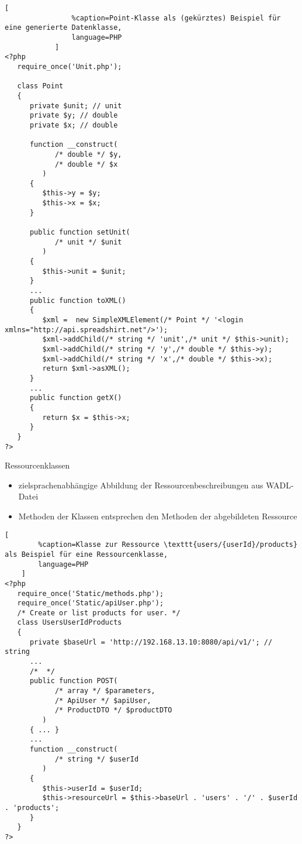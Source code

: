 \begin{frame}
    \begin{multicols}{2}
        \begin{lstlisting}[
                %caption=Point-Klasse als (gekürztes) Beispiel für eine generierte Datenklasse,
                language=PHP
            ]
<?php
   require_once('Unit.php');

   class Point
   {
      private $unit; // unit 
      private $y; // double 
      private $x; // double 

      function __construct(
            /* double */ $y,
            /* double */ $x
         )
      {
         $this->y = $y;
         $this->x = $x;
      }

      public function setUnit(
            /* unit */ $unit
         )
      {
         $this->unit = $unit;
      }
      ...
      public function toXML()
      {
         $xml =  new SimpleXMLElement(/* Point */ '<login xmlns="http://api.spreadshirt.net"/>');
         $xml->addChild(/* string */ 'unit',/* unit */ $this->unit);
         $xml->addChild(/* string */ 'y',/* double */ $this->y);
         $xml->addChild(/* string */ 'x',/* double */ $this->x);
         return $xml->asXML();
      }
      ...
      public function getX()
      {
         return $x = $this->x;
      }
   }
?>
        \end{lstlisting}
    \end{multicols}
\end{frame}

\begin{frame}{Ressourcenklassen}
    \begin{itemize}
        \item zielsprachenabhängige Abbildung der Ressourcenbeschreibungen aus WADL-Datei
        \item Methoden der Klassen entsprechen den Methoden der abgebildeten Ressource
    \end{itemize}
\end{frame}

\begin{frame}
    \begin{lstlisting}[
        %caption=Klasse zur Ressource \texttt{users/{userId}/products} als Beispiel für eine Ressourcenklasse,
        language=PHP
    ]
<?php
   require_once('Static/methods.php');
   require_once('Static/apiUser.php');
   /* Create or list products for user. */
   class UsersUserIdProducts
   {
      private $baseUrl = 'http://192.168.13.10:8080/api/v1/'; // string
      ...
      /*  */
      public function POST(
            /* array */ $parameters, 
            /* ApiUser */ $apiUser,
            /* ProductDTO */ $productDTO
         )
      { ... }
      ...
      function __construct(
            /* string */ $userId
         )
      {
         $this->userId = $userId;
         $this->resourceUrl = $this->baseUrl . 'users' . '/' . $userId . 'products';
      }
   }
?>
    \end{lstlisting}
\end{frame}

